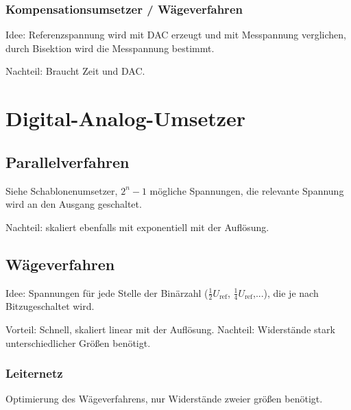 \subsubsection{Kompensationsumsetzer / Wägeverfahren}
Idee: Referenzspannung wird mit DAC erzeugt und mit Messpannung verglichen, durch Bisektion wird die Messpannung bestimmt.

Nachteil: Braucht Zeit und DAC.

\section{Digital-Analog-Umsetzer}
\subsection{Parallelverfahren}
Siehe Schablonenumsetzer, $2^n -1$ mögliche Spannungen, die relevante Spannung wird an den Ausgang geschaltet.

Nachteil: skaliert ebenfalls mit exponentiell mit der Auflösung.

\subsection{Wägeverfahren}
Idee: Spannungen für jede Stelle der Binärzahl ($\frac{1}{2} U_\text{ref}$, $\frac{1}{4} U_\text{ref}$,...), die je nach Bitzugeschaltet wird.

Vorteil: Schnell, skaliert linear mit der Auflösung. Nachteil: Widerstände stark unterschiedlicher Größen benötigt.

\subsubsection{Leiternetz}
Optimierung des Wägeverfahrens, nur Widerstände zweier größen benötigt.
